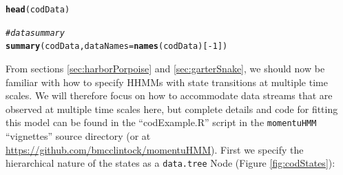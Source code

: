 \documentclass[12pt]{article}\usepackage[]{graphicx}\usepackage[]{xcolor}
\makeatletter
\newcommand{\hlnum}[1]{\textcolor[rgb]{0.686,0.059,0.569}{#1}}%
\newcommand{\hlcom}[1]{\textcolor[rgb]{0.678,0.584,0.686}{\textit{#1}}}%
\newcommand{\hlopt}[1]{\textcolor[rgb]{0,0,0}{#1}}%
\newcommand{\hldef}[1]{\textcolor[rgb]{0.345,0.345,0.345}{#1}}%
\newcommand{\hlkwc}[1]{\textcolor[rgb]{0.333,0.667,0.333}{#1}}%
\newcommand{\hlkwd}[1]{\textcolor[rgb]{0.737,0.353,0.396}{\textbf{#1}}}%
\newenvironment{kframe}{%
 \def\at@end@of@kframe{}%
 \ifinner\ifhmode%
  \def\at@end@of@kframe{\end{minipage}}%
  \begin{minipage}{\columnwidth}%
 \fi\fi%
 \def\FrameCommand##1{\hskip\@totalleftmargin \hskip-\fboxsep
 \colorbox{shadecolor}{##1}\hskip-\fboxsep
     \hskip-\linewidth \hskip-\@totalleftmargin \hskip\columnwidth}%
 \MakeFramed {\advance\hsize-\width
   \@totalleftmargin\z@ \linewidth\hsize
   \@setminipage}}%
 {\par\unskip\endMakeFramed%
 \at@end@of@kframe}
\newenvironment{knitrout}{}{} %
\makeatother
\begin{document}
\begin{knitrout}
\color{fgcolor}\begin{kframe}
\begin{alltt}
\hlkwd{head}\hldef{(codData)}

\hlcom{# data summary}
\hlkwd{summary}\hldef{(codData,}\hlkwc{dataNames}\hldef{=}\hlkwd{names}\hldef{(codData)[}\hlopt{-}\hlnum{1}\hldef{])}
\end{alltt}
\end{kframe}
\end{knitrout}

From sections \ref{sec:harborPorpoise} and \ref{sec:garterSnake}, we should now be familiar with how to specify HHMMs with state transitions at multiple time scales. We will therefore focus on how to accommodate data streams that are observed at multiple time scales here, but complete details and code for fitting this model can be found in the ``codExample.R'' script in the \verb|momentuHMM| ``vignettes'' source directory (or at \url{https://github.com/bmcclintock/momentuHMM}). First we specify the hierarchical nature of the states as a \verb|data.tree| Node (Figure \ref{fig:codStates}):
\end{document}
